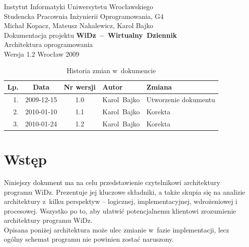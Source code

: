 \documentclass[12pt,leqno,twoside]{mwart}
\begin{document}
\begin{titlepage}
\begin{center}
Instytut Informatyki Uniwersytetu Wrocławskiego \\
Studencka Pracownia Inżynierii Oprogramowania, G4 \\
\vspace{4cm}
\Large Michał Kopacz, Mateusz Nahalewicz, Karol Bajko \\
\vspace{0.5cm}
\huge Dokumentacja projektu \mbox{\textbf{WiDz -- Wirtualny Dziennik}} \\ \Large Architektura oprogramowania\\
\vspace{1cm}
\normalsize Wersja 1.2
\vfill
\normalsize Wrocław 2009
\end{center}
\end{titlepage}

\newpage
\vfill
\renewcommand*{\tablename}{Tabela}
\begin{table}
	\centering
	\caption{Historia zmian w~dokumencie}
		\begin{tabular}{|r|c|c|p{}|l|}
		\hline
		Lp. 	& Data       & Nr wersji 	& Autor           		& Zmiana \\ \hline
		1.   	& 2009-12-15 & 1.0       	& \mbox{Karol Bajko} & Utworzenie dokumentu \\ \hline
		2.   	& 2010-01-10 & 1.1       	& \mbox{Karol Bajko} & Korekta \\ \hline
		3.   	& 2010-01-24 & 1.2       	& \mbox{Karol Bajko} & Korekta \\ \hline
		\end{tabular}
\end{table}

\tableofcontents
\newpage

\section{Wstęp}
\noindent Niniejszy dokument ma na celu przedstawienie czytelnikowi architektury programu WiDz. Prezentuje jej kluczowe składniki, a także skupia się na analizie architektury z~kilku perspektyw -- logicznej, implementacyjnej, wdrożeniowej i procesowej. Wszystko po to, aby ułatwić potencjalnemu klientowi zrozumienie architektury programu WiDz.\\
\indent Opisana poniżej architektura może ulec zmianie w~fazie implementacji, lecz ogólny schemat programu nie powinien zostać naruszony.
\end{document}
